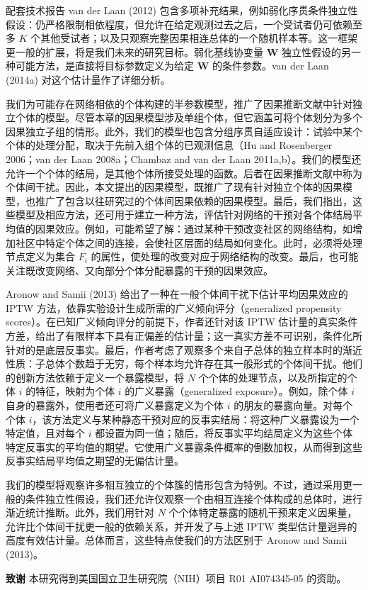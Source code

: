 配套技术报告 van der Laan (2012) 包含多项补充结果，例如弱化序贯条件独立性假设：仍严格限制相依程度，但允许在给定观测过去之后，一个受试者仍可依赖至多 $K$ 个其他受试者；以及只观察完整因果相连总体的一个随机样本等。这一框架更一般的扩展，将是我们未来的研究目标。弱化基线协变量 $\mathbf W$ 独立性假设的另一种可能方法，是直接将目标参数定义为给定 $\mathbf W$ 的条件参数。van der Laan (2014a) 对这个估计量作了详细分析。

我们为可能存在网络相依的个体构建的半参数模型，推广了因果推断文献中针对独立个体的模型。尽管本章的因果模型涉及单组个体，但它涵盖可将个体划分为多个因果独立子组的情形。此外，我们的模型也包含分组序贯自适应设计：试验中某个个体的处理分配，取决于先前入组个体的已观测信息（Hu and Rosenberger 2006；van der Laan 2008a；Chambaz and van der Laan 2011a,b）。我们的模型还允许一个个体的结局，是其他个体所接受处理的函数。后者在因果推断文献中称为个体间干扰。因此，本文提出的因果模型，既推广了现有针对独立个体的因果模型，也推广了包含以往研究过的个体间因果依赖的因果模型。最后，我们指出，这些模型及相应方法，还可用于建立一种方法，评估针对网络的干预对各个体结局平均值的因果效应。例如，可能希望了解：通过某种干预改变社区的网络结构，如增加社区中特定个体之间的连接，会使社区层面的结局如何变化。此时，必须将处理节点定义为集合 $F_i$ 的属性，使处理的改变对应于网络结构的改变。最后，也可能关注既改变网络、又向部分个体分配暴露的干预的因果效应。

Aronow and Samii (2013) 给出了一种在一般个体间干扰下估计平均因果效应的 IPTW 方法，依靠实验设计生成所需的广义倾向评分（generalized propensity scores）。在已知广义倾向评分的前提下，作者还针对该 IPTW 估计量的真实条件方差，给出了有限样本下具有正偏差的估计量；这一真实方差不可识别，条件化所针对的是底层反事实。最后，作者考虑了观察多个来自子总体的独立样本时的渐近性质：子总体个数趋于无穷，每个样本均允许存在其一般形式的个体间干扰。他们的创新方法依赖于定义一个暴露模型，将 $N$ 个个体的处理节点，以及所指定的个体 $i$ 的特征，映射为个体 $i$ 的广义暴露（generalized exposure）。例如，除个体 $i$ 自身的暴露外，使用者还可将广义暴露定义为个体 $i$ 的朋友的暴露向量。对每个个体 $i$，该方法定义与某种静态干预对应的反事实结局：将这种广义暴露设为一个特定值，且对每个 $i$ 都设置为同一值；随后，将反事实平均结局定义为这些个体特定反事实的平均值的期望。它使用广义暴露条件概率的倒数加权，从而得到这些反事实结局平均值之期望的无偏估计量。

我们的模型将观察许多相互独立的个体簇的情形包含为特例。不过，通过采用更一般的条件独立性假设，我们还允许仅观察一个由相互连接个体构成的总体时，进行渐近统计推断。此外，我们用针对 $N$ 个个体特定暴露的随机干预来定义因果量，允许比个体间干扰更一般的依赖关系，并开发了与上述 IPTW 类型估计量迥异的高度有效估计量。总体而言，这些特点使我们的方法区别于 Aronow and Samii (2013)。

\medskip
\noindent\textbf{致谢} 本研究得到美国国立卫生研究院（NIH）项目 R01 AI074345-05 的资助。
